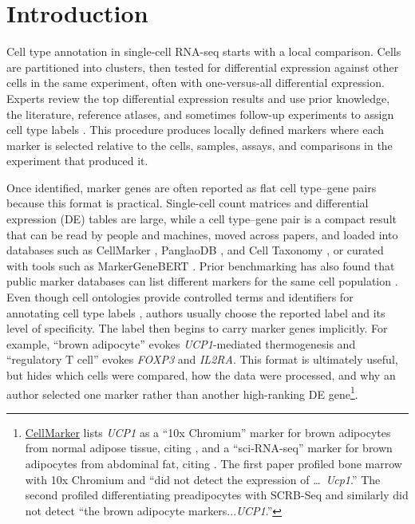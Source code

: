 \documentclass[10pt,twocolumn]{article}
\theoremstyle{plain}
\theoremstyle{definition}
\theoremstyle{remark}
\begin{document}
\section{Introduction}

Cell type annotation in single-cell RNA-seq starts with a local comparison. Cells are partitioned into clusters, then tested for differential expression against other cells in the same experiment, often with one-versus-all differential expression. Experts review the top differential expression results and use prior knowledge, the literature, reference atlases, and sometimes follow-up experiments to assign cell type labels \citep{Macosko_2015,Stuart_2019,Wolf_2018,Heumos_2023,Abdelaal2019CellIdentification,Pullin2024MarkerSelection}. This procedure produces locally defined markers where each marker is selected relative to the cells, samples, assays, and comparisons in the experiment that produced it.

Once identified, marker genes are often reported as flat cell type--gene pairs because this format is practical. Single-cell count matrices and differential expression (DE) tables are large, while a cell type--gene pair is a compact result that can be read by people and machines, moved across papers, and loaded into databases such as CellMarker \citep{Hu2022CellMarker}, PanglaoDB \citep{Franzn_2019}, and Cell Taxonomy \citep{Jiang_2022}, or curated with tools such as MarkerGeneBERT \citep{Cheng_2024}. Prior benchmarking has also found that public marker databases can list different markers for the same cell population \citep{Abdelaal2019CellIdentification}. Even though cell ontologies provide controlled terms and identifiers for annotating cell type labels \citep{OsumiSutherland2021CellOntologies,tan2026cellontologyagesinglecell}, authors usually choose the reported label and its level of specificity. The label then begins to carry marker genes implicitly. For example, ``brown adipocyte'' evokes \textit{UCP1}-mediated thermogenesis and ``regulatory T cell'' evokes \textit{FOXP3} and \textit{IL2RA}. This format is ultimately useful, but hides which cells were compared, how the data were processed, and why an author selected one marker rather than another high-ranking DE gene\footnote{\href{http://www.bio-bigdata.center/CellMarkerDetail.jsp?species=Human&tissue_type=Adipose\%20tissue&tissue_class=Adipose\%20tissue&cell_name=Brown\%20adipocyte&cell_type=Normal\%20cell&marker=Ucp1&marker_source=Experiment&fourtable=four}{CellMarker} lists \textit{UCP1} as a ``10x Chromium'' marker for brown adipocytes from normal adipose tissue, citing \citep{Zhong2020bone}, and a ``sci-RNA-seq'' marker for brown adipocytes from abdominal fat, citing \citep{Ramirez_2020}. The first paper profiled bone marrow with 10x Chromium and ``did not detect the expression of \ldots\ \textit{Ucp1}.'' The second profiled differentiating preadipocytes with SCRB-Seq and similarly did not detect ``the brown adipocyte markers...\textit{UCP1}.''}.
\end{document}
